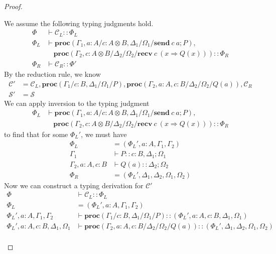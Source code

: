 \documentclass[12pt, openany]{memoir}
\newcommand*{\send}[2]{\textbf{send}\ #1\ #2}
\newcommand*{\recv}[2]{\textbf{recv}\ #1\ #2}
\newcommand*{\procObj}[4]{\textbf{proc}(#1/#2/#3/#4)}
\newcommand*{\config}[0]{\mathcal{C}}
\newcommand*{\cancelSet}[0]{\mathcal{S}}
\begin{document}
\begin{proof}
\begin{itemize}
    We assume the following typing judgments hold.
    \begin{align*}
      \Phi & \vdash \config_L :: \Phi_L \\
      \Phi_L & \vdash \procObj{\Gamma_1, a : A}{c : A \otimes B, \Delta_1}{\Omega_1}{\send{c}{a}; P}, \\
      & \quad \procObj{\Gamma_2, c : A \otimes B}{\Delta_2}{\Omega_2}{\recv{c}{(x \Rightarrow Q(x))}} :: \Phi_R \\
      \Phi_R & \vdash \config_R :: \Phi'
    \end{align*}
    By the reduction rule, we know
    \begin{align*}
      \config' &= \config_L, \procObj{\Gamma_1}{c : B, \Delta_1}{\Omega_1}{P}, \procObj{\Gamma_2, a : A, c : B}{\Delta_2}{\Omega_2}{Q(a)}, \config_R \\
      \cancelSet' &= \cancelSet
    \end{align*}
    We can apply inversion to the typing judgment
    \begin{align*}
      \Phi_L & \vdash \procObj{\Gamma_1, a : A}{c : A \otimes B, \Delta_1}{\Omega_1}{\send{c}{a}; P}, \\
      & \quad \procObj{\Gamma_2, c : A \otimes B}{\Delta_2}{\Omega_2}{\recv{c}{(x \Rightarrow Q(x))}} :: \Phi_R
    \end{align*}
    to find that for some $\Phi_L'$, we must have
    \begin{align*}
      \Phi_L & = (\Phi_L', a : A, \Gamma_1, \Gamma_2) \\
      \Gamma_1 & \vdash P :: c : B, \Delta_1; \Omega_1 \\
      \Gamma_2, a : A, c : B & \vdash Q(a) :: \Delta_2; \Omega_2 \\
      \Phi_R & = (\Phi_L', \Delta_1, \Delta_2, \Omega_1, \Omega_2)
    \end{align*}
    Now we can construct a typing derivation for $\config'$
    \begin{align*}
      \Phi & \vdash \config_L :: \Phi_L \\
      \Phi_L & = (\Phi_L', a : A, \Gamma_1, \Gamma_2) \\
      \Phi_L', a : A, \Gamma_1, \Gamma_2 & \vdash \procObj{\Gamma_1}{c : B, \Delta_1}{\Omega_1}{P} :: (\Phi_L', a : A, c : B, \Delta_1, \Omega_1) \\
      \Phi_L', a : A, c : B, \Delta_1, \Omega_1 & \vdash \procObj{\Gamma_2, a : A, c : B}{\Delta_2}{\Omega_2}{Q(a)} :: (\Phi_L', \Delta_1, \Delta_2, \Omega_1, \Omega_2) \\

\end{align*}
\end{itemize}
\end{proof}
\end{document}
